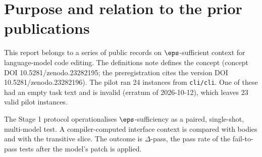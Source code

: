 \begin{abstract}
This report describes three exploratory ablation phases run before the confirmatory study of a registered report on $\eps$-sufficient context for language-model code editing in Go. None of the results is confirmatory. Some aggregates were seen before repairs, the instance sets were chosen by screens on the evaluated models, and eleven instances from two repositories are a small basis.

Phase 1 removed dependency interfaces one group at a time on 23 pilot instances (Haiku 5.5, $k=20$). The count of apparently necessary groups (33 of 135) lay inside a null reference.

Phase 2 ran four models on 10 screened instances. On Haiku 5.5, 7/10 instances had no arm reaching 0.1. No average difference was resolved between the write-set bodies (W), W plus dependency interfaces (A1) and the predictor-selected arms.

Leave-one-out at $k=100$ gave counts inside their null ranges. On cli 2bcdfbb1ac02, however, removing one package moved the pass rate from 0.27 to 0.00.

Phase 3 tested declaration-level arms and token-matched padding on 11 instances with headroom. On Haiku 5.5 with post-screen samples (a choice not preregistered), a reachable-declaration slice of W was non-inferior to W at $\eps = 0.05$ (lower bound $-0.043$, median token ratio 0.47). It was not non-inferior with screen samples included ($-0.051$). On Sonnet 5.5 it was worse ($-0.045$ $[-0.082, -0.009]$). Inert padding lowered Haiku 5.5 pass rates (Wpad$-$W $-0.138$ $[-0.281, -0.018]$).
\end{abstract}

\section{Purpose and relation to the prior publications}

This report belongs to a series of public records on $\eps$-sufficient context for language-model code editing. The definitions note \cite{definitions} defines the concept (concept DOI 10.5281/zenodo.23282195; the preregistration cites the version DOI 10.5281/zenodo.23282196). The pilot \cite{pilot} ran 24 instances from \texttt{cli/cli}. One of these had an empty task text and is invalid (erratum of 2026-10-12), which leaves 23 valid pilot instances.

The Stage 1 protocol \cite{stage1} operationalises $\eps$-sufficiency as a paired, single-shot, multi-model test. A compiler-computed interface context is compared with bodies and with the transitive slice. The outcome is $\Delta$-pass, the pass rate of the fail-to-pass tests after the model's patch is applied.

